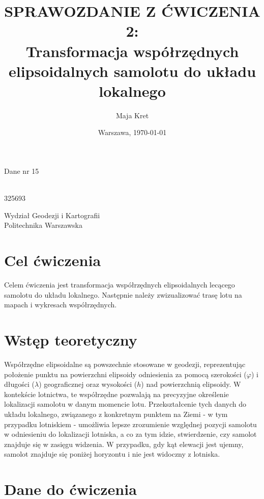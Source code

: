 \documentclass[fleqn,10pt,a4paper]{article}
\title{\textbf{SPRAWOZDANIE Z ĆWICZENIA 2:}\\ Transformacja współrzędnych elipsoidalnych samolotu do układu lokalnego}
\author{Maja Kret}
\date{Warszawa, \today}
\makeatletter
\renewcommand{\maketitle}{%
  \begin{titlepage}
    \begin{center}
      \vspace*{2cm}
      {\huge \@title \par}
      \vspace{1.5cm}
      {\large Dane nr 15\par}
      \vspace{1.5cm}
      {\large \@author \\ 325693 \par}
      {\large Wydział Geodezji i Kartografii\\ Politechnika Warszawska \par}
      \vspace{9cm}
      {\large \@date \par}
      \vspace{1.5cm}
    \end{center}
  \end{titlepage}
}
\makeatother
\begin{document}
 
\pagestyle{fancy}
\fancyhf{}
\rfoot{\thepage}
\renewcommand{\headrulewidth}{0pt}
\maketitle
\rhead{~}

\tableofcontents
\newpage

\section{Cel ćwiczenia}
Celem ćwiczenia jest transformacja współrzędnych elipsoidalnych lecącego samolotu do układu lokalnego. 
Następnie należy zwizualizować trasę lotu na mapach i wykresach współrzędnych.

\section{Wstęp teoretyczny}

Współrzędne elipsoidalne są powszechnie stosowane w geodezji, reprezentując położenie punktu 
na powierzchni elipsoidy odniesienia za pomocą szerokości ($\varphi$) i długości ($\lambda$) geograficznej oraz wysokości ($h$) nad powierzchnią 
elipsoidy. W kontekście lotnictwa, te współrzędne pozwalają na precyzyjne określenie lokalizacji samolotu w danym momencie lotu. 
Przekształcenie tych danych do układu lokalnego, związanego z konkretnym punktem na Ziemi - w tym przypadku lotniskiem - umożliwia lepsze 
zrozumienie względnej pozycji samolotu w odniesieniu do lokalizacji lotniska, a co za tym idzie, stwierdzenie, czy samolot znajduje się w zasięgu widzenia.
W przypadku, gdy kąt elewacji jest ujemny, samolot znajduje się poniżej horyzontu i nie jest widoczny z lotniska.

\section{Dane do ćwiczenia}
\end{document}
